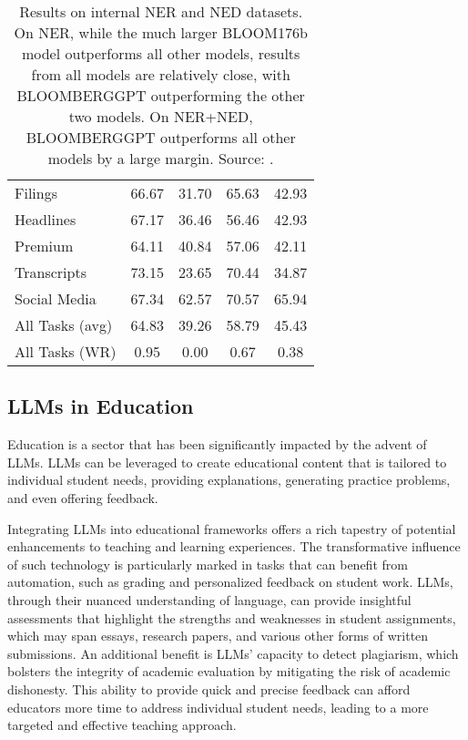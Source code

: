 \begin{table}[h!]
\begin{tabularx}{\textwidth}{Xcccc}
		Filings         & 66.67                 & 31.70             & 65.63                           & 42.93                              \\
		Headlines       & 67.17                 & 36.46             & 56.46                           & 42.93                              \\
		Premium         & 64.11                 & 40.84             & 57.06                           & 42.11                              \\
		Transcripts     & 73.15                 & 23.65             & 70.44                           & 34.87                              \\
		Social Media    & 67.34                 & 62.57             & 70.57                           & 65.94                              \\
		\midrule
		All Tasks (avg) & 64.83                 & 39.26             & 58.79                           & 45.43                              \\
		All Tasks (WR)  & 0.95                  & 0.00              & 0.67                            & 0.38                               \\
		\bottomrule
	\end{tabularx}
	\caption{Results on internal NER and NED datasets. On NER, while the much larger BLOOM176b model outperforms all other models, results from all models are relatively close, with BLOOMBERGGPT outperforming the other two models. On NER+NED, BLOOMBERGGPT outperforms all other models by a large margin. Source: \protect\textcite{wu2023bloomberggpt}.}
	\label{tab:ner_ned_results}
\end{table}

\subsection{LLMs in Education}
\label{subsec:llms-in-education}

Education is a sector that has been significantly impacted by the advent of LLMs. LLMs can be leveraged to create educational content that is tailored to individual student needs, providing explanations, generating practice problems, and even offering feedback.

Integrating LLMs into educational frameworks offers a rich tapestry of potential enhancements to teaching and learning experiences.
The transformative influence of such technology is particularly marked in tasks that can benefit from automation, such as grading and personalized feedback on student work.
LLMs, through their nuanced understanding of language, can provide insightful assessments that highlight the strengths and weaknesses in student assignments, which may span essays, research papers, and various other forms of written submissions.
An additional benefit is LLMs' capacity to detect plagiarism, which bolsters the integrity of academic evaluation by mitigating the risk of academic dishonesty.
This ability to provide quick and precise feedback can afford educators more time to address individual student needs, leading to a more targeted and effective teaching approach.

